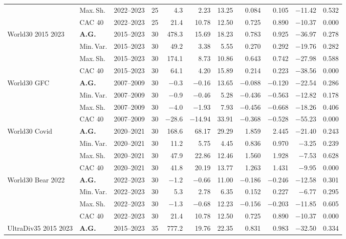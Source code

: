 \begin{longtable}{p{2.6cm} l c c r r r r r r r}
 & Max.\,Sh. & 2022--2023 & 25 & 4.3 & 2.23 & 13.25 & 0.084 & 0.105 & $-$11.42 & 0.532 \\
 & CAC 40 & 2022--2023 & 25 & 21.4 & 10.78 & 12.50 & 0.725 & 0.890 & $-$10.37 & 0.000 \\
\midrule
World30 2015 2023 & \textbf{A.G.} & 2015--2023 & 30 & 478.3 & 15.69 & 18.23 & 0.783 & 0.925 & $-$36.97 & 0.278 \\
 & Min.\,Var. & 2015--2023 & 30 & 49.2 & 3.38 & 5.55 & 0.270 & 0.292 & $-$19.76 & 0.282 \\
 & Max.\,Sh. & 2015--2023 & 30 & 174.1 & 8.73 & 10.86 & 0.643 & 0.742 & $-$27.98 & 0.588 \\
 & CAC 40 & 2015--2023 & 30 & 64.1 & 4.20 & 15.89 & 0.214 & 0.223 & $-$38.56 & 0.000 \\
\midrule
World30 GFC & \textbf{A.G.} & 2007--2009 & 30 & $-$0.3 & $-$0.16 & 13.65 & $-$0.088 & $-$0.120 & $-$22.54 & 0.286 \\
 & Min.\,Var. & 2007--2009 & 30 & $-$0.9 & $-$0.46 & 5.28 & $-$0.436 & $-$0.563 & $-$12.82 & 0.178 \\
 & Max.\,Sh. & 2007--2009 & 30 & $-$4.0 & $-$1.93 & 7.93 & $-$0.456 & $-$0.668 & $-$18.26 & 0.406 \\
 & CAC 40 & 2007--2009 & 30 & $-$28.6 & $-$14.94 & 33.91 & $-$0.368 & $-$0.528 & $-$55.23 & 0.000 \\
\midrule
World30 Covid & \textbf{A.G.} & 2020--2021 & 30 & 168.6 & 68.17 & 29.29 & 1.859 & 2.445 & $-$21.40 & 0.243 \\
 & Min.\,Var. & 2020--2021 & 30 & 11.2 & 5.75 & 4.45 & 0.836 & 0.970 & $-$3.25 & 0.239 \\
 & Max.\,Sh. & 2020--2021 & 30 & 47.9 & 22.86 & 12.46 & 1.560 & 1.928 & $-$7.53 & 0.628 \\
 & CAC 40 & 2020--2021 & 30 & 41.8 & 20.19 & 13.77 & 1.263 & 1.431 & $-$9.95 & 0.000 \\
\midrule
World30 Bear 2022 & \textbf{A.G.} & 2022--2023 & 30 & $-$1.2 & $-$0.66 & 11.00 & $-$0.186 & $-$0.246 & $-$12.58 & 0.301 \\
 & Min.\,Var. & 2022--2023 & 30 & 5.3 & 2.78 & 6.35 & 0.152 & 0.227 & $-$6.77 & 0.295 \\
 & Max.\,Sh. & 2022--2023 & 30 & $-$1.3 & $-$0.68 & 12.23 & $-$0.156 & $-$0.203 & $-$11.85 & 0.605 \\
 & CAC 40 & 2022--2023 & 30 & 21.4 & 10.78 & 12.50 & 0.725 & 0.890 & $-$10.37 & 0.000 \\
\midrule
UltraDiv35 2015 2023 & \textbf{A.G.} & 2015--2023 & 35 & 777.2 & 19.76 & 22.35 & 0.831 & 0.983 & $-$32.50 & 0.334 \\

\end{longtable}
